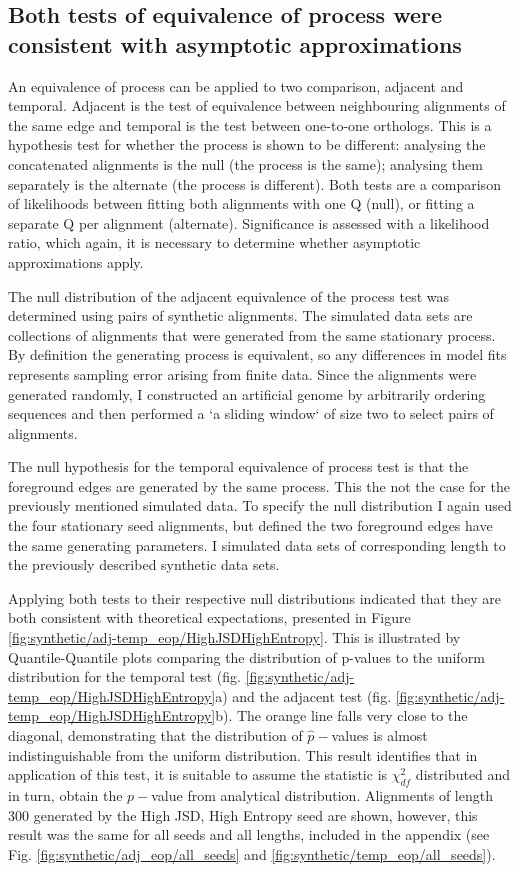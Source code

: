 

\subsection*{Both tests of equivalence of process were consistent with asymptotic approximations}

An equivalence of process can be applied to two comparison, adjacent and temporal. Adjacent is the test of equivalence between neighbouring alignments of the same edge and temporal is the test between one-to-one orthologs. This is a hypothesis test for whether the process is shown to be different: analysing the concatenated alignments is the null (the process is the same); analysing them separately is the alternate (the process is different). Both tests are a comparison of likelihoods between fitting both alignments with one $\mathrm{Q}$ (null), or fitting a separate $\mathrm{Q}$ per alignment (alternate). Significance is assessed with a likelihood ratio, which again, it is necessary to determine whether asymptotic approximations apply. 

The null distribution of the adjacent equivalence of the process test was determined using pairs of synthetic alignments. The simulated data sets are collections of alignments that were generated from the same stationary process. By definition the generating process is equivalent, so any differences in model fits represents sampling error arising from finite data. Since the alignments were generated randomly, I constructed an artificial genome by arbitrarily ordering sequences and then performed a `a sliding window` of size two to select pairs of alignments.

The null hypothesis for the temporal equivalence of process test is that the foreground edges are generated by the same process. This the not the case for the previously mentioned simulated data. To specify the null distribution I again used the four stationary seed alignments, but defined the two foreground edges have the same generating parameters. I simulated data sets of corresponding length to the previously described synthetic data sets. 

Applying both tests to their respective null distributions indicated that they are both consistent with theoretical expectations, presented in Figure \ref{fig:synthetic/adj-temp_eop/HighJSDHighEntropy}. This is illustrated by Quantile-Quantile plots comparing the distribution of p-values to the uniform distribution for the temporal test (fig. \ref{fig:synthetic/adj-temp_eop/HighJSDHighEntropy}a) and the adjacent test (fig. \ref{fig:synthetic/adj-temp_eop/HighJSDHighEntropy}b). The orange line falls very close to the diagonal, demonstrating that the distribution of $\hat p-$values is almost indistinguishable from the uniform distribution.  This result identifies that in application of this test, it is suitable to assume the statistic is $\chi^2_{df}$ distributed and in turn, obtain the $p-$value from analytical distribution. Alignments of length 300 generated by the High JSD, High Entropy seed are shown, however, this result was the same for all seeds and all lengths, included in the appendix (see Fig. \ref{fig:synthetic/adj_eop/all_seeds} and \ref{fig:synthetic/temp_eop/all_seeds}).

